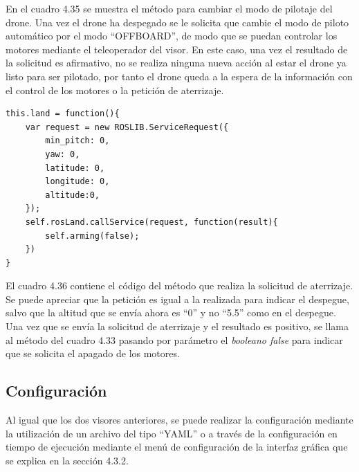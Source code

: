 En el cuadro 4.35 se muestra el método para cambiar el modo de pilotaje del drone. Una vez el drone ha despegado se le solicita que cambie el modo de piloto automático por el modo ``OFFBOARD'', de modo que se puedan controlar los motores mediante el teleoperador del visor. En este caso, una vez el resultado de la solicitud es afirmativo, no se realiza ninguna nueva acción al estar el drone ya listo para ser pilotado, por tanto el drone queda a la espera de la información con el control de los motores o la petición de aterrizaje.

\begin{lstlisting}[caption= Método para cambiar el modo de pilotaje, label=cod.setMode]
this.land = function(){
	var request = new ROSLIB.ServiceRequest({
		min_pitch: 0,
		yaw: 0,
		latitude: 0,
		longitude: 0,
		altitude:0,
	});
	self.rosLand.callService(request, function(result){
		self.arming(false);
	})
}
\end{lstlisting}

El cuadro 4.36 contiene el código del método que realiza la solicitud de aterrizaje. Se puede apreciar que la petición es igual a la realizada para indicar el despegue, salvo que la altitud que se envía ahora es ``0'' y no ``5.5'' como en el despegue. Una vez que se envía la solicitud de aterrizaje y el resultado es positivo, se llama al método del cuadro 4.33 pasando por parámetro el \textit{booleano false} para indicar que se solicita el apagado de los motores.

\subsection{Configuración}
Al igual que los dos visores anteriores, se puede realizar la configuración mediante la utilización de un archivo del tipo ``YAML'' o a través de la configuración en tiempo de ejecución mediante el menú de configuración de la interfaz gráfica que se explica en la sección 4.3.2.

